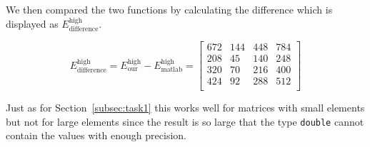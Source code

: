 \documentclass[paper=a4, fontsize=11pt]{article} %
\begin{document}
We then compared the two functions by calculating the difference which
is displayed as $E_{\text{difference}}^{\text{high}}$.


\[
  E_{\text{difference}}^{\text{high}} = E_{\text{our}}^{\text{high}} - E_{\text{matlab}}^{\text{high}} =
\begin{bmatrix}
 672 & 144 & 448 & 784 \\
 208 & 45 & 140 & 248 \\
 320 & 70 & 216 & 400 \\
 424 & 92 & 288 & 512 \\
\end{bmatrix}
\]

Just as for Section~\ref{subsec:task1} this works well for matrices
with small elements but not for large elements since the result is so
large that the type \texttt{double} cannot contain the values with
enough precision.



\end{document}
